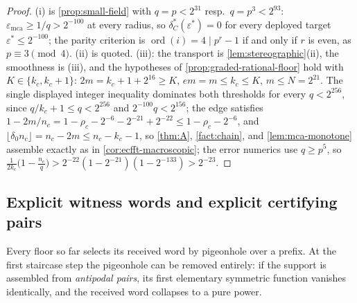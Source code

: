 \documentclass[11pt]{article}
\theoremstyle{definition}
\theoremstyle{remark}
\newcommand{\emca}{\varepsilon_{\mathrm{mca}}}
\begin{document}
\begin{proof}
(i) is \cref{prop:small-field} with $q=p<2^{31}$ resp.\ $q=p^3<2^{93}$: $\emca\ge1/q>2^{-100}$ at every radius, so $\delta^*_C(\varepsilon^*)=0$ for every deployed target $\varepsilon^*\le2^{-100}$; the parity criterion is $\operatorname{ord}(i)=4\mid p^r-1$ if and only if $r$ is even, as $p\equiv3\pmod4$. (ii) is quoted. (iii): the transport is \cref{lem:stereographic}\textup{(ii)}, the smoothness is \textup{(iii)}, and the hypotheses of \cref{prop:graded-rational-floor} hold with $K\in\{k_c,k_c+1\}$: $2m=k_c+1+2^{16}\ge K$, $em=m\le k_c\le K$, $m\le N=2^{21}$. The single displayed integer inequality dominates both thresholds for every $q<2^{256}$, since $q/k_c+1\le q<2^{256}$ and $2^{-100}q<2^{156}$; the edge satisfies $1-2m/n_c=1-\rho_c-2^{-6}-2^{-21}+2^{-22}\le1-\rho_c-2^{-6}$, and $\lfloor\delta_0 n_c\rfloor=n_c-2m\le n_c-k_c-1$, so \cref{thm:A}, \cref{fact:chain}, and \cref{lem:mca-monotone} assemble exactly as in \cref{cor:ecfft-macroscopic}; the error numerics use $q\ge p^5$, so $\frac1{2k_c}\bigl(1-\frac{n_c}q\bigr)>2^{-22}(1-2^{-21})(1-2^{-133})>2^{-23}$.
\end{proof}

\subsection{Explicit witness words and explicit certifying pairs}\label{sec:answers-explicit}

Every floor so far selects its received word by pigeonhole over a prefix. At the first staircase step the pigeonhole can be removed entirely: if the support is assembled from \emph{antipodal pairs}, its first elementary symmetric function vanishes identically, and the received word collapses to a pure power.
\end{document}
